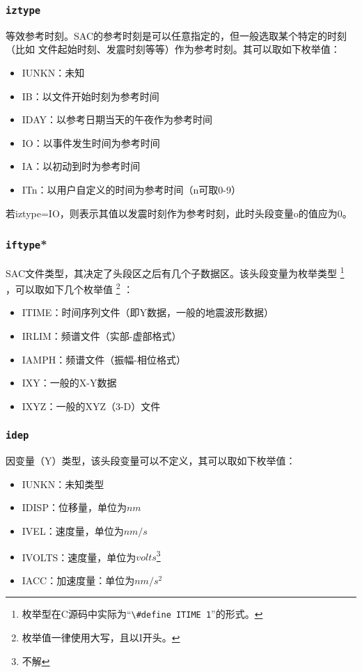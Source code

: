 \subsubsection{\texttt{iztype}}
等效参考时刻。SAC的参考时刻是可以任意指定的，但一般选取某个特定的时刻（比如
文件起始时刻、发震时刻等等）作为参考时刻。其可以取如下枚举值：
\begin{itemize}
\ttfamily
\item IUNKN：未知
\item IB：以文件开始时刻为参考时间
\item IDAY：以参考日期当天的午夜作为参考时间
\item IO：以事件发生时间为参考时间
\item IA：以初动到时为参考时间
\item ITn：以用户自定义的时间为参考时间（n可取0-9）
\end{itemize}

若iztype=IO，则表示其值以发震时刻作为参考时刻，此时头段变量o的值应为0。

\subsubsection{\texttt{iftype}*}
SAC文件类型，其决定了头段区之后有几个子数据区。该头段变量为枚举类型
\footnote{枚举型在C源码中实际为``\verb+\#define ITIME 1+''的形式。}
，可以取如下几个枚举值
\footnote{枚举值一律使用大写，且以I开头。} ：
\begin{itemize}
\ttfamily
\item ITIME：时间序列文件（即Y数据，一般的地震波形数据）
\item IRLIM：频谱文件（实部-虚部格式）
\item IAMPH：频谱文件（振幅-相位格式）
\item IXY：一般的X-Y数据
\item IXYZ：一般的XYZ（3-D）文件
\end{itemize}

\subsubsection{\texttt{idep}}
因变量（Y）类型，该头段变量可以不定义，其可以取如下枚举值：
\begin{itemize}
\ttfamily
\item IUNKN：未知类型
\item IDISP：位移量，单位为$nm$
\item IVEL：速度量，单位为$nm/s$
\item IVOLTS：速度量，单位为$volts$\footnote{不解}
\item IACC：加速度量：单位为$nm/s^2$
\end{itemize}

